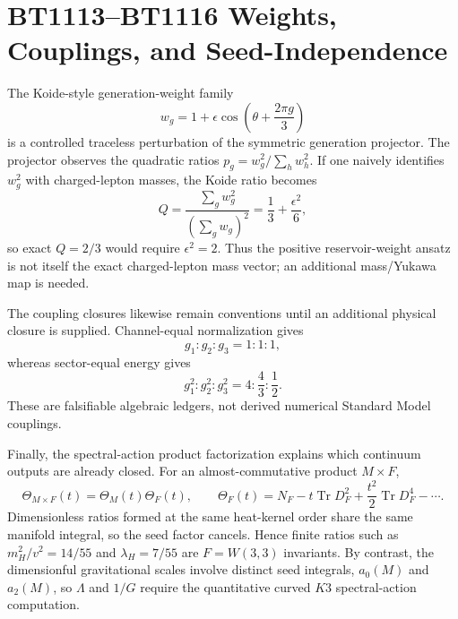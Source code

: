 \section{BT1113--BT1116 Weights, Couplings, and Seed-Independence}
\label{sec:bt1113-bt1116-weight-coupling-factorization}

The Koide-style generation-weight family
\[
w_g=1+\epsilon\cos\left(\theta+\frac{2\pi g}{3}\right)
\]
is a controlled traceless perturbation of the symmetric generation projector.  The projector observes the quadratic ratios $p_g=w_g^2/\sum_h w_h^2$.  If one naively identifies $w_g^2$ with charged-lepton masses, the Koide ratio becomes
\[
Q=\frac{\sum_g w_g^2}{(\sum_g w_g)^2}=\frac13+\frac{\epsilon^2}{6},
\]
so exact $Q=2/3$ would require $\epsilon^2=2$.  Thus the positive reservoir-weight ansatz is not itself the exact charged-lepton mass vector; an additional mass/Yukawa map is needed.

The coupling closures likewise remain conventions until an additional physical closure is supplied.  Channel-equal normalization gives
\[
g_1:g_2:g_3=1:1:1,
\]
whereas sector-equal energy gives
\[
g_1^2:g_2^2:g_3^2=4:\frac43:\frac12.
\]
These are falsifiable algebraic ledgers, not derived numerical Standard Model couplings.

Finally, the spectral-action product factorization explains which continuum outputs are already closed.  For an almost-commutative product $M\times F$,
\[
\Theta_{M\times F}(t)=\Theta_M(t)\Theta_F(t),
\qquad
\Theta_F(t)=N_F-t\operatorname{Tr}D_F^2+\frac{t^2}{2}\operatorname{Tr}D_F^4-\cdots .
\]
Dimensionless ratios formed at the same heat-kernel order share the same manifold integral, so the seed factor cancels.  Hence finite ratios such as $m_H^2/v^2=14/55$ and $\lambda_H=7/55$ are $F=W(3,3)$ invariants.  By contrast, the dimensionful gravitational scales involve distinct seed integrals, $a_0(M)$ and $a_2(M)$, so $\Lambda$ and $1/G$ require the quantitative curved $K3$ spectral-action computation.
